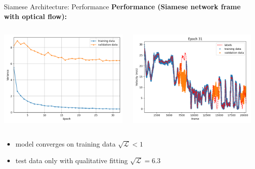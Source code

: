 \begin{frame}{Siamese Architecture: Performance}
	\textbf{Performance (Siamese network frame with optical flow):}
	\begin{columns}[c]
		\begin{column}{0.5\textwidth}
			\includegraphics[width=\textwidth]{imgs/siamese_offrames_training.png}
		\end{column}
		\begin{column}{0.5\textwidth}
			\includegraphics[width=\textwidth]{imgs/siamese_offrames_performance.png}
		\end{column}
	\end{columns}
	\begin{itemize}
		\item model converges on training data $\sqrt{\mathcal{L}} < 1$
		\item test data only with qualitative fitting $\sqrt{\mathcal{L}} = 6.3$
	\end{itemize}
\end{frame}

